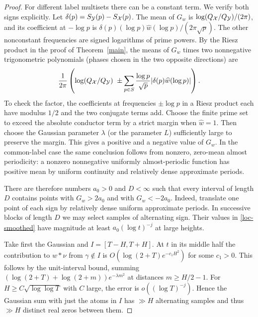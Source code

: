 \begin{proof}
For different label multisets there can be a constant term. We verify both
signs explicitly. Let $\delta(p)=S_{\mathcal Y}(p)-S_{\mathcal X}(p)$.
The mean of $G_w$ is $\log(Q_{\mathcal X}/Q_{\mathcal Y})/(2\pi)$, and its coefficient
at $-\log p$ is $\delta(p)(\log p)\widehat w(\log p)/(2\pi\sqrt p)$.
The other nonconstant frequencies are signed logarithms of prime powers.
By the Riesz product in the proof of Theorem~\ref{main}, the means of $G_w$
times two nonnegative trigonometric polynomials (phases chosen in the two
opposite directions) are
\[
 \frac1{2\pi}\left(\log(Q_{\mathcal X}/Q_{\mathcal Y})\ \pm
 \sum_{p\in S}\frac{\log p}{\sqrt p}
       |\delta(p)\widehat w(\log p)|\right).
\]
To check the factor, the coefficients at frequencies $\pm\log p$ in a Riesz
product each have modulus $1/2$ and the two conjugate terms add.
Choose the finite prime set to exceed the absolute conductor term by a
strict margin when $\widehat w=1$. Then choose the Gaussian parameter
$\lambda$ (or the parameter $L$) sufficiently large to preserve the margin.
This gives a positive and a negative value of $G_w$. In the common-label
case the same conclusion follows from nonzero, zero-mean almost periodicity:
a nonzero nonnegative uniformly almost-periodic function has positive mean
by uniform continuity and relatively dense approximate periods.

There are therefore numbers $a_0>0$ and $D<\infty$ such that every interval
of length $D$ contains points with $G_w>2a_0$ and with $G_w<-2a_0$.
Indeed, translate one point of each sign by relatively dense uniform
approximate periods. In successive blocks of length $D$ we may select samples
of alternating sign. Their values in \eqref{loc-smoothed} have magnitude at
least $a_0(\log t)^{-j}$ at large heights.

Take first the Gaussian and $I=[T-H,T+H]$. At $t$ in its middle half the
contribution to $w*\nu$ from $\gamma\notin I$ is
$O(\log(2+T)e^{-c_1H^2})$ for some $c_1>0$.
This follows by the unit-interval bound, summing
$(\log(2+T)+\log(2+m))e^{-\lambda m^2}$ at distances
$m\ge H/2-1$. For $H\ge C\sqrt{\log\log T}$ with $C$ large, the error is
$o((\log T)^{-j})$. Hence the Gaussian sum with just the atoms in $I$ has
$\gg H$ alternating samples and thus $\gg H$ distinct real zeros between them.


\end{proof}
